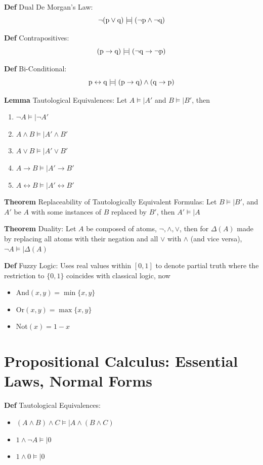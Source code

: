 \documentclass[11pt,notitlepage]{report}
\newcommand{\tbf}[1]{\textbf{#1}}
\newcommand{\modelsm}{\mathrel{\models\!\rvert}}
\begin{document}
\textbf{Def} Dual De Morgan's Law: 
$$\neg(\rm p \vee \rm q) \modelsm (\neg \rm p \wedge \neg \rm q)$$

\textbf{Def} Contrapositives: 
$$(\rm p \to \rm q) \modelsm (\neg \rm q \to \neg \rm p)$$

\textbf{Def} Bi-Conditional: 
$$\rm p \leftrightarrow \rm q \modelsm (\rm p \to \rm q) \wedge (\rm q \to \rm p)$$

\textbf{Lemma} Tautological Equivalences: Let $A \modelsm A'$ and $B \modelsm B'$, then
\begin{enumerate}
    \item $\neg A \modelsm \neg A'$
    \item $A \wedge B \modelsm A' \wedge B'$
    \item $A \vee B \modelsm A' \vee B'$
    \item $A \to B \modelsm A' \to B'$
    \item $A \leftrightarrow B \modelsm A' \leftrightarrow B'$
\end{enumerate}

\tbf{Theorem} Replaceability of Tautologically Equivalent Formulas: Let $B \modelsm B'$, and $A'$ be $A$ with some instances of $B$ replaced by $B'$, then $A' \modelsm A$

\tbf{Theorem} Duality: Let $A$ be composed of atoms, $\neg, \wedge, \vee$, then for $\Delta(A)$ made by replacing all atoms with their negation and all $\vee$ with $\wedge$ (and vice versa), $\neg A \modelsm \Delta(A)$

\tbf{Def} Fuzzy Logic: Uses real values within $[0, 1]$ to denote partial truth where the restriction to $\{0, 1\}$ coincides with classical logic, now 
\begin{itemize}
    \item And$(x, y) = \min\{x, y\}$
    \item Or$(x, y) = \max\{x, y\}$
    \item Not$(x) = 1 - x$
\end{itemize}
\vspace{-2mm}

\section{Propositional Calculus: Essential Laws, Normal Forms}

\textbf{Def} Tautological Equivalences: 
\vspace{-2mm}
\begin{itemize}
    \item $(A \wedge B) \wedge C \modelsm A \wedge (B \wedge C)$
    \item $1 \wedge \neg A \modelsm 0$
    \item $1 \wedge 0 \modelsm 0$
\end{itemize}
\end{document}
